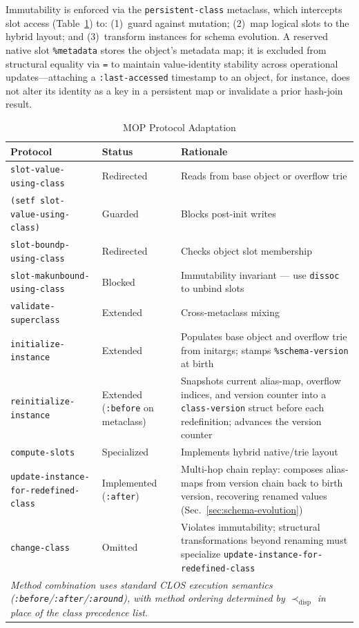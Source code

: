 \documentclass[sigconf,nonacm]{acmart}
\begin{document}
Immutability is enforced via the \texttt{persistent-class} metaclass, which intercepts slot access (Table~\ref{tab:mop-ops}) to: (1)~guard against mutation; (2)~map logical slots to the hybrid layout; and (3)~transform instances for schema evolution. A reserved native slot \texttt{\%metadata} stores the object's metadata map; it is excluded from structural equality via \texttt{=} to maintain value-identity stability across operational updates---attaching a \texttt{:last-accessed} timestamp to an object, for instance, does not alter its identity as a key in a persistent map or invalidate a prior hash-join result.
\begin{table}[tp]
\caption{MOP Protocol Adaptation}
\label{tab:mop-ops}

\begin{tabularx}{\textwidth}{l l X}
\toprule
\textbf{Protocol} & \textbf{Status} & \textbf{Rationale} \\
\midrule
\texttt{slot-value-using-class} & Redirected & Reads from base object or overflow trie \\
\texttt{(setf slot-value-using-class)} & Guarded & Blocks post-init writes \\
\texttt{slot-boundp-using-class} & Redirected & Checks object slot membership \\
\texttt{slot-makunbound-using-class} & Blocked & Immutability invariant --- use \texttt{dissoc} to unbind slots \\
\texttt{validate-superclass} & Extended & Cross-metaclass mixing \\
\texttt{initialize-instance} & Extended & Populates base object and overflow trie from initargs; stamps \texttt{\%schema-version} at birth \\
\texttt{reinitialize-instance} & Extended (\texttt{:before} on metaclass) & Snapshots current alias-map, overflow indices, and version counter into a \texttt{class-version} struct before each redefinition; advances the version counter \\
\texttt{compute-slots} & Specialized & Implements hybrid native/trie layout \\
\texttt{update-instance-for-redefined-class} & Implemented (\texttt{:after}) & Multi-hop chain replay: composes alias-maps from version chain back to birth version, recovering renamed values (Sec.~\ref{sec:schema-evolution}) \\
\texttt{change-class} & Omitted & Violates immutability; structural transformations beyond renaming must specialize \texttt{update-instance-for-redefined-class} \\
\midrule
\multicolumn{3}{l}{\textit{Method combination uses standard CLOS execution semantics (\texttt{:before}/\texttt{:after}/\texttt{:around}), with method ordering determined by $\prec_{\text{disp}}$ in place of the class precedence list.}} \\
\bottomrule
\end{tabularx}
\end{table}
\end{document}
